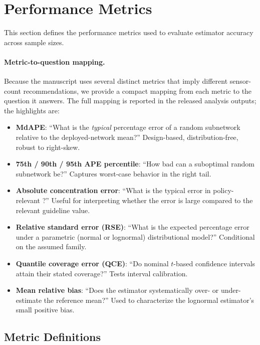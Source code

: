 \section{Performance Metrics}
\label{sec:si_metrics}

This section defines the performance metrics used to evaluate estimator accuracy across sample sizes.

\paragraph{Metric-to-question mapping.} Because the manuscript uses several distinct metrics that imply different sensor-count recommendations, we provide a compact mapping from each metric to the question it answers. The full mapping is reported in the released analysis outputs; the highlights are:

\begin{itemize}
 \item \textbf{MdAPE}: ``What is the \emph{typical} percentage error of a random subnetwork relative to the deployed-network mean?'' Design-based, distribution-free, robust to right-skew.
 \item \textbf{75th / 90th / 95th APE percentile}: ``How bad can a suboptimal random subnetwork be?'' Captures worst-case behavior in the right tail.
 \item \textbf{Absolute concentration error}: ``What is the typical error in policy-relevant \units?'' Useful for interpreting whether the error is large compared to the relevant guideline value.
 \item \textbf{Relative standard error (RSE)}: ``What is the expected percentage error under a parametric (normal or lognormal) distributional model?'' Conditional on the assumed family.
 \item \textbf{Quantile coverage error (QCE)}: ``Do nominal $t$-based confidence intervals attain their stated coverage?'' Tests interval calibration.
 \item \textbf{Mean relative bias}: ``Does the estimator systematically over- or under-estimate the reference mean?'' Used to characterize the lognormal estimator's small positive bias.
\end{itemize}


\subsection{Metric Definitions}
\label{sec:si_metric_definitions}

